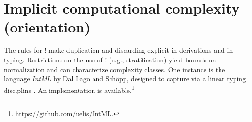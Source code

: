 \section{Implicit computational complexity (orientation)}
\label{sec:icc-orientation}
The rules for ${!}$ make duplication and discarding explicit in derivations and in typing. Restrictions on the use of ${!}$ (e.g., stratification) yield bounds on normalization and can characterize complexity classes. One instance is the language \emph{IntML} by Dal Lago and Sch\"opp, designed to capture \textbf{} via a linear typing discipline \cite{DALLAGO2016150}. An implementation is available.\footnote{\url{https://github.com/uelis/IntML}.}
